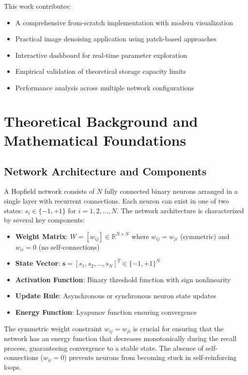\documentclass[11pt,a4paper]{article}
\begin{document}
This work contributes:
\begin{itemize}
    \item A comprehensive from-scratch implementation with modern visualization
    \item Practical image denoising application using patch-based approaches
    \item Interactive dashboard for real-time parameter exploration
    \item Empirical validation of theoretical storage capacity limits
    \item Performance analysis across multiple network configurations
\end{itemize}

\section{Theoretical Background and Mathematical Foundations}

\subsection{Network Architecture and Components}

A Hopfield network consists of $N$ fully connected binary neurons arranged in a single layer with recurrent connections. Each neuron can exist in one of two states: $s_i \in \{-1, +1\}$ for $i = 1, 2, \ldots, N$. The network architecture is characterized by several key components:

\begin{itemize}
    \item \textbf{Weight Matrix}: $W = [w_{ij}] \in \mathbb{R}^{N \times N}$ where $w_{ij} = w_{ji}$ (symmetric) and $w_{ii} = 0$ (no self-connections)
    \item \textbf{State Vector}: $\mathbf{s} = [s_1, s_2, \ldots, s_N]^T \in \{-1, +1\}^N$
    \item \textbf{Activation Function}: Binary threshold function with sign nonlinearity
    \item \textbf{Update Rule}: Asynchronous or synchronous neuron state updates
    \item \textbf{Energy Function}: Lyapunov function ensuring convergence
\end{itemize}

The symmetric weight constraint $w_{ij} = w_{ji}$ is crucial for ensuring that the network has an energy function that decreases monotonically during the recall process, guaranteeing convergence to a stable state. The absence of self-connections ($w_{ii} = 0$) prevents neurons from becoming stuck in self-reinforcing loops.
\end{document}
